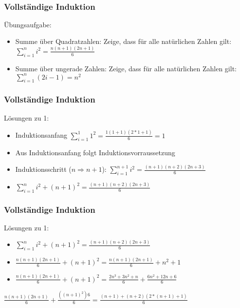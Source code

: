 \begin{frame}
    \frametitle{Vollständige Induktion}
    Übungsaufgabe:
        \begin{itemize}

    \vfill \item Summe über Quadratzahlen: Zeige, dass für alle natürlichen Zahlen gilt:
    \newline $\sum_{i=1}^{n} i^2 = \frac{n(n+1)(2n+1)}{6}$
     \vfill \item Summe über ungerade Zahlen: Zeige, dass für alle natürlichen Zahlen gilt:
    \newline $\sum_{i=1}^{n} (2i-1) = n^2$
    \end{itemize}

\end{frame}

\begin{frame}
    \frametitle{Vollständige Induktion}
    Lösungen zu 1:
        \begin{itemize}

    \vfill \item Induktionsanfang
    \newline $\sum_{i=1}^{1} 1^2 = \frac{1(1+1)(2*1+1)}{6}=1$
        \vfill \item Aus Induktionsanfang folgt Induktionsvorraussetzung
        \vfill \item Induktionsschritt ($n \Rightarrow n+1$):
    \newline $\sum_{i=1}^{n+1} i^2 = \frac{(n+1)(n+2)(2n+3)}{6}$
            \vfill \item $\sum_{i=1}^{n} i^2 + (n+1)^2 = \frac{(n+1)(n+2)(2n+3)}{6}$
    \end{itemize}

\end{frame}

\begin{frame}
    \frametitle{Vollständige Induktion}
    Lösungen zu 1:
        \begin{itemize}
            \vfill \item $\sum_{i=1}^{n} i^2 + (n+1)^2 = \frac{(n+1)(n+2)(2n+3)}{6}$
            \vfill \item $\frac{n(n+1)(2n+1)}{6} + (n+1)^2 = \frac{n(n+1)(2n+1)}{6} +n^2 +1$
            \vfill \item $\frac{n(n+1)(2n+1)}{6} + (n+1)^2 = \frac{2n^3 +3n^2 +n}{6} + \frac{6n^2 +12n+6}{6}$
    \end{itemize}
    \vfill $\frac{n(n+1)(2n+1)}{6} + \frac{((n+1)^2)6}{6} = \frac{(n+1) + (n+2)(2*(n+1)+1)}{6}$

\end{frame}
